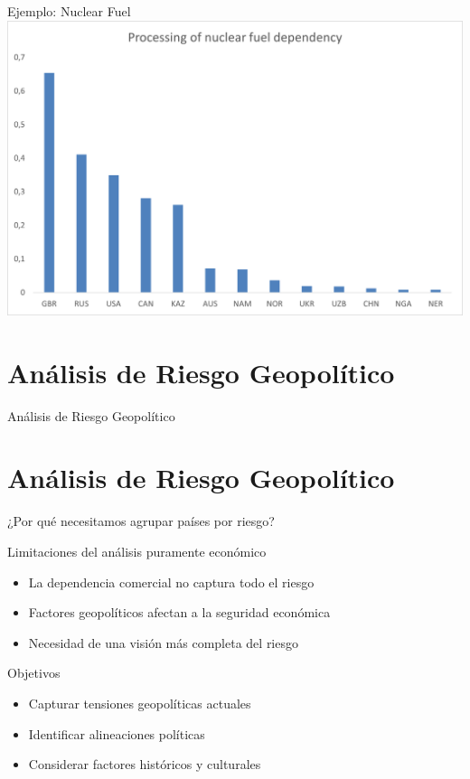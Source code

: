 \documentclass{beamer}
\begin{document}
\begin{frame}{Ejemplo: Nuclear Fuel}
    \centering
    \includegraphics[width=0.8\linewidth]{../Imagenes/Nuclear fig.png}
    
\end{frame}




\section{Análisis de Riesgo Geopolítico}
\begin{frame}
    \centering
    \Huge{Análisis de Riesgo Geopolítico}
\end{frame}
\section{Análisis de Riesgo Geopolítico}


\begin{frame}{¿Por qué necesitamos agrupar países por riesgo?}
    \begin{block}{Limitaciones del análisis puramente económico}
        \begin{itemize}
            \item La dependencia comercial no captura todo el riesgo
            \item Factores geopolíticos afectan a la seguridad económica
            \item Necesidad de una visión más completa del riesgo
        \end{itemize}
    \end{block}
    
    \begin{block}{Objetivos}
        \begin{itemize}
            \item Capturar tensiones geopolíticas actuales
            \item Identificar alineaciones políticas
            \item Considerar factores históricos y culturales
        \end{itemize}
    \end{block}
\end{frame}
\end{document}
